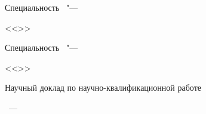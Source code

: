 \thispagestyle{empty}

\noindent%

\vspace{0pt plus1fill} %
\begin{center}
\textbf {\large \thesisAuthor}
\end{center}

\vspace{0pt plus3fill} %
\begin{center}
\textbf {\Large %
\thesisTitle}

\vspace{0pt plus3fill} %
{\large Специальность \thesisSpecialtyNumber\ "---\par <<\thesisSpecialtyTitle>>}

\ifdefined\thesisSpecialtyTwoNumber
{\large Специальность \thesisSpecialtyTwoNumber\ "---\par <<\thesisSpecialtyTwoTitle>>}
\fi

\vspace{0pt plus1.5fill} %
\Large{Научный доклад по научно-квалификационной работе}\par
\end{center}

\vspace{0pt plus4fill} %
{\centering\thesisCity~--- \thesisYear\par}

